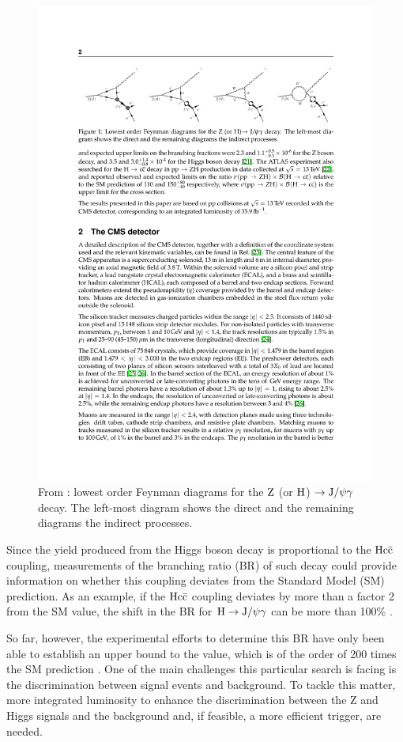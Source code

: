 \documentclass[11pt, a4paper]{article}
\renewcommand{\H}{{\rm H}}
\newcommand{\Z}{{\rm Z}}
\newcommand{\JPsi}{{\rm J}/\psi}
\begin{document}
\begin{figure}[htbp]
    \centering
    \includegraphics[width=0.9\linewidth]{images/direct_and_indirect_processes.pdf}
    \caption{From \cite{mainarticle}: lowest order Feynman diagrams for the $\Z$ (or $\H$) $\rightarrow \JPsi\gamma$ decay. The left-most diagram shows the direct and the remaining diagrams the indirect processes.
    \label{im:direct_and_indirect_processes}}
\end{figure}

Since the yield produced from the Higgs boson decay is proportional to the ${\rm Hc\bar{c}}$ coupling, measurements of the branching ratio (BR) of such decay could provide information on whether this coupling deviates from the Standard Model (SM) prediction. As an example, if the ${\rm Hc\bar{c}}$ coupling deviates by more than a factor 2 from the SM value, the shift in the BR for $\H \rightarrow \JPsi\gamma$ can be more than 100\% \cite{PhysRevD.88.053003}.

So far, however, the experimental efforts to determine this BR have only been able to establish an upper bound to the value, which is of the order of 200 times the SM prediction \cite{mainarticle}. One of the main challenges this particular search is facing is the discrimination between signal events and background. To tackle this matter, more integrated luminosity to enhance the discrimination between the Z and Higgs signals and the background and, if feasible, a more efficient trigger, are needed.
\end{document}
